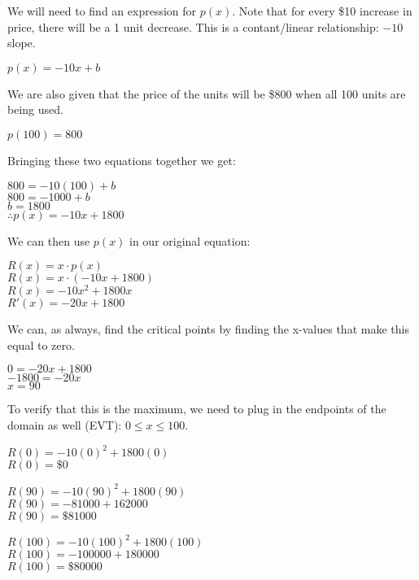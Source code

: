 \documentclass[12pt,fleqn]{book} %
\begin{document}
\noindent We will need to find an expression for $p(x)$. Note that for every \$10 increase in price, there will be a 1 unit decrease. This is a contant/linear relationship: $-10$ slope.

\begin{center}
    $p(x) = -10x + b$
\end{center}

\noindent We are also given that the price of the units will be \$800 when all 100 units are being used.

\begin{center}
    $p(100)=800$
\end{center}

\noindent Bringing these two equations together we get:

\begin{center}
    $800=-10(100)+b$ \\
    $800=-1000+b$ \\
    $b=1800$ \\
    $\therefore p(x)=-10x+1800$
\end{center}

\noindent We can then use $p(x)$ in our original equation:

\begin{center}
    $R(x) = x \cdot p(x)$ \\
    $R(x)=x \cdot (-10x+1800)$ \\
    $R(x)=-10x^2+1800x$ \\
    $R'(x)=-20x+1800$
\end{center}

\noindent We can, as always, find the critical points by finding the x-values that make this equal to zero.

\begin{center}
    $0 =-20x+1800$ \\
    $-1800=-20x$ \\
    $x=90$ \\
\end{center}

\noindent To verify that this is the maximum, we need to plug in the endpoints of the domain as well (EVT): $0\leq x \leq 100$.

\begin{multicols}{3}
    \begin{center}
        $R(0)=-10(0)^2+1800(0)$ \\
        $R(0)=\$0$
        \columnbreak

        $R(90)=-10(90)^2+1800(90)$ \\
        $R(90)=-81000+162000$ \\
        $R(90)=\$81000$
        \columnbreak

        $R(100)=-10(100)^2+1800(100)$ \\
        $R(100)=-100000+180000$ \\
        $R(100)=\$80000$
    \end{center}
\end{multicols}
\end{document}
